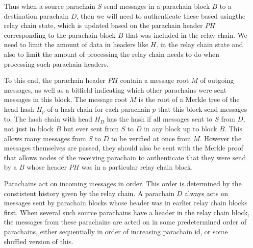 Thus when a source parachain $S$ send messages in a parachain block $B$ to a destination parachain $D$, then we will need to authenticate these based usingthe relay chain state, which is updated based on the parachain header $PH$ corresponding to the parachain block $B$ that was included in the relay chain. We need to limit the amount of data in headers like $H$, in the relay chain state and also to limit the amount of processing the relay chain needs to do when processing such parachain headers.

To this end, the parachain header $PH$ contain a message root $M$ of outgoing messages, as well as a bitfield indicating which other parachains were sent messages in this block.
The message root $M$ is the root of a Merkle tree of the head hash $H_p$ of a hash chain for each parachain $p$ that this block send messages to.  The hash chain with head $H_D$ has the hash if all messages sent to $S$ from $D$, not just in block $B$ but ever sent from $S$ to $D$ in any block up to block $B$. This allows many messages from $S$ to $D$  to be verified at once from $M$.
However the messages themselves are passed, they should also be sent with the Merkle proof that allows nodes of the receiving parachain
to authenticate that they were send by a $B$ whose header  $PH$ was in a particular relay chain block. 

Parachains act on incoming messages in order. This order is determined by the constistent history given by the relay chain. A parachain $D$ always acts on messages sent by parachain blocks whose header was in earlier relay chain blocks first. When several such source parachains have a header in the relay chain block, the messages from these parachains are acted on in some predetermined order of parachains, either sequentially in order of increasing parachain id, or some shuffled version of this. 


